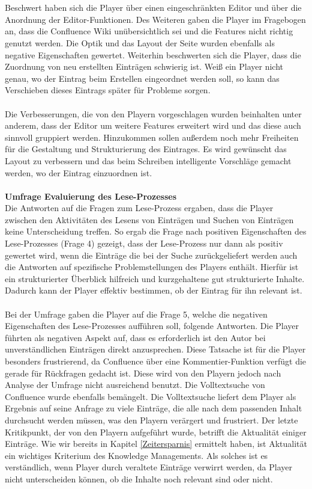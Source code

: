 \documentclass[a4paper,12pt,twoside]{scrartcl}
\begin{document}
\\\\
Beschwert haben sich die Player über einen eingeschränkten Editor und über die Anordnung der Editor-Funktionen. Des Weiteren gaben die Player im Fragebogen an, dass die Confluence Wiki unübersichtlich sei und die Features nicht richtig genutzt werden. Die Optik und das Layout der Seite wurden ebenfalls als negative Eigenschaften gewertet. Weiterhin beschwerten sich die Player, dass die Zuordnung von neu erstellten Einträgen schwierig ist. Weiß ein Player nicht genau, wo der Eintrag beim Erstellen eingeordnet werden soll, so kann das Verschieben dieses Eintrags später für Probleme sorgen.
\\\\
Die Verbesserungen, die von den Playern vorgeschlagen wurden beinhalten unter anderem, dass der Editor um weitere Features erweitert wird und das diese auch sinnvoll gruppiert werden. Hinzukommen sollen außerdem noch mehr Freiheiten für die Gestaltung und Strukturierung des Eintrages. Es wird gewünscht das Layout zu verbessern und das beim Schreiben intelligente Vorschläge gemacht werden, wo der Eintrag einzuordnen ist.
\\\\
\textbf{Umfrage Evaluierung des Lese-Prozesses}\\
Die Antworten auf die Fragen zum Lese-Prozess ergaben, dass die Player zwischen den Aktivitäten des Lesens von Einträgen und Suchen von Einträgen keine Unterscheidung treffen. So ergab die Frage nach positiven Eigenschaften des Lese-Prozesses (Frage 4) gezeigt, dass der Lese-Prozess nur dann als positiv gewertet wird, wenn die Einträge die bei der Suche zurückgeliefert werden auch die Antworten auf spezifische Problemstellungen des Players enthält. Hierfür ist ein strukturierter Überblick hilfreich und kurzgehaltene gut strukturierte Inhalte. Dadurch kann der Player effektiv bestimmen, ob der Eintrag für ihn relevant ist.
\\\\
Bei der Umfrage gaben die Player auf die Frage 5, welche die negativen Eigenschaften des Lese-Prozesses aufführen soll, folgende Antworten. Die Player führten als negativen Aspekt auf, dass es erforderlich ist den Autor bei unverständlichen Einträgen direkt anzusprechen. Diese Tatsache ist für die Player besonders frustrierend, da Confluence über eine Kommentier-Funktion verfügt die gerade für Rückfragen gedacht ist. Diese wird von den Playern jedoch nach Analyse der Umfrage nicht ausreichend benutzt. Die Volltextsuche von Confluence wurde ebenfalls bemängelt. Die Volltextsuche liefert dem Player als Ergebnis auf seine Anfrage zu viele Einträge, die alle nach dem passenden Inhalt durchsucht werden müssen, was den Playern verärgert und frustriert. Der letzte Kritikpunkt, der von den Playern aufgeführt wurde, betrifft die Aktualität einiger Einträge. Wie wir bereits in Kapitel \ref{Zeitersparnis} ermittelt haben, ist Aktualität ein wichtiges Kriterium des Knowledge Managements. Als solches ist es verständlich, wenn Player durch veraltete Einträge verwirrt werden, da Player nicht unterscheiden können, ob die Inhalte noch relevant sind oder nicht. 
\end{document}
